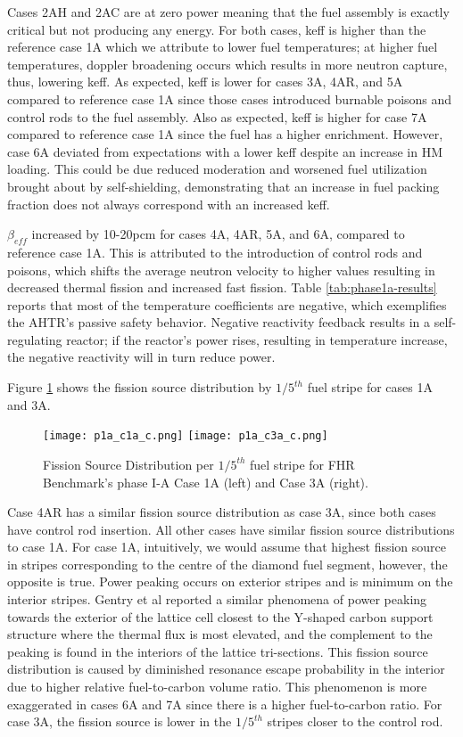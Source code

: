 Cases 2AH and 2AC are at zero power meaning that the fuel assembly is exactly 
critical but not producing any energy. 
For both cases, keff is higher than the reference case 1A which we attribute to 
lower fuel temperatures; at higher fuel temperatures, doppler broadening occurs 
which results in more neutron capture, thus, lowering keff. 
As expected, keff is lower for cases 3A, 4AR, and 5A compared to reference case 
1A since those cases introduced burnable poisons and control rods to the fuel 
assembly. 
Also as expected, keff is higher for case 7A compared to reference case 1A since 
the fuel has a higher enrichment. 
However, case 6A deviated from expectations with a lower keff despite an increase 
in \gls{HM} loading. 
This could be due reduced moderation and worsened fuel utilization brought 
about by self-shielding, demonstrating that an increase in fuel packing 
fraction does not always correspond with an increased keff. 

$\beta_{eff}$ increased by 10-20pcm for cases 4A, 4AR, 5A, and 6A, compared to
reference case 1A.
This is attributed to the introduction of control rods and poisons, which 
shifts the average neutron velocity to higher values resulting in decreased
thermal fission and increased fast fission\cite{torabi_neutronic_2018}.
Table \ref{tab:phase1a-results} reports that most of the temperature coefficients 
are negative, which exemplifies the \gls{AHTR}'s passive safety behavior. 
Negative reactivity feedback results in a self-regulating reactor; if the reactor's 
power rises, resulting in temperature increase, the negative reactivity will in turn 
reduce power. 

Figure \ref{fig:phase1a-c} shows the fission source distribution by 
$1/5^{th}$ fuel stripe for cases 1A and 3A. 
\begin{figure}[]
    \centering
    \texttt{[image: p1a\_c1a\_c.png]} 
    \texttt{[image: p1a\_c3a\_c.png]} 
    \caption{Fission Source Distribution per $1/5^{th}$ fuel stripe for \gls{FHR} 
    Benchmark's phase I-A Case 1A (left) and Case 3A (right).}
    \label{fig:phase1a-c}
\end{figure}
Case 4AR has a similar fission source distribution as case 3A, since both 
cases have control rod insertion. 
All other cases have similar fission source distributions to case 1A. 
For case 1A, intuitively, we would assume that highest fission source in stripes 
corresponding to the centre of the diamond fuel segment, however, the opposite is 
true. 
Power peaking occurs on exterior stripes and is minimum on the interior stripes.  
Gentry et al \cite{gentry_development_2016} reported a similar phenomena of 
power peaking towards the exterior of the lattice cell closest to the Y-shaped 
carbon support structure where the thermal flux is most elevated, and the 
complement to the peaking is found in the interiors of the lattice tri-sections. 
This fission source distribution is caused by  diminished resonance escape 
probability in the interior due to higher relative fuel-to-carbon volume ratio. 
This phenomenon is more exaggerated in cases 6A and 7A since there is a higher 
fuel-to-carbon ratio. 
For case 3A, the fission source is lower in the $1/5^{th}$ stripes closer to 
the control rod.  

